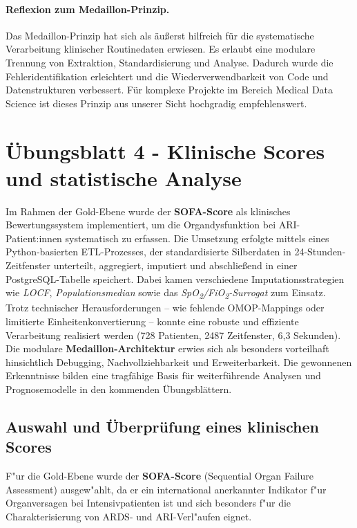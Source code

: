 \documentclass[12pt]{article}
\begin{document}
\paragraph{Reflexion zum Medaillon-Prinzip.}
Das Medaillon-Prinzip hat sich als äußerst hilfreich für die systematische Verarbeitung klinischer Routinedaten erwiesen. Es erlaubt eine modulare Trennung von Extraktion, Standardisierung und Analyse. Dadurch wurde die Fehleridentifikation erleichtert und die Wiederverwendbarkeit von Code und Datenstrukturen verbessert. Für komplexe Projekte im Bereich Medical Data Science ist dieses Prinzip aus unserer Sicht hochgradig empfehlenswert.

\section{Übungsblatt 4 - Klinische Scores und statistische Analyse}

Im Rahmen der Gold-Ebene wurde der \textbf{SOFA-Score} als klinisches Bewertungssystem implementiert, um die Organdysfunktion bei ARI-Patient:innen systematisch zu erfassen. Die Umsetzung erfolgte mittels eines Python-basierten ETL-Prozesses, der standardisierte Silberdaten in 24-Stunden-Zeitfenster unterteilt, aggregiert, imputiert und abschließend in einer PostgreSQL-Tabelle speichert. Dabei kamen verschiedene Imputationsstrategien wie \textit{LOCF}, \textit{Populationsmedian} sowie das \textit{SpO\textsubscript{2}/FiO\textsubscript{2}-Surrogat} zum Einsatz.\\

\noindent
Trotz technischer Herausforderungen – wie fehlende OMOP-Mappings oder limitierte Einheitenkonvertierung – konnte eine robuste und effiziente Verarbeitung realisiert werden (728 Patienten, 2487 Zeitfenster, 6{,}3 Sekunden). Die modulare \textbf{Medaillon-Architektur} erwies sich als besonders vorteilhaft hinsichtlich Debugging, Nachvollziehbarkeit und Erweiterbarkeit. Die gewonnenen Erkenntnisse bilden eine tragfähige Basis für weiterführende Analysen und Prognosemodelle in den kommenden Übungsblättern.


\subsection{Auswahl und Überprüfung eines klinischen Scores}

F"ur die Gold-Ebene wurde der \textbf{SOFA-Score} (Sequential Organ Failure Assessment) ausgew"ahlt, da er ein international anerkannter Indikator f"ur Organversagen bei Intensivpatienten ist und sich besonders f"ur die Charakterisierung von ARDS- und ARI-Verl"aufen eignet.\\
\end{document}
